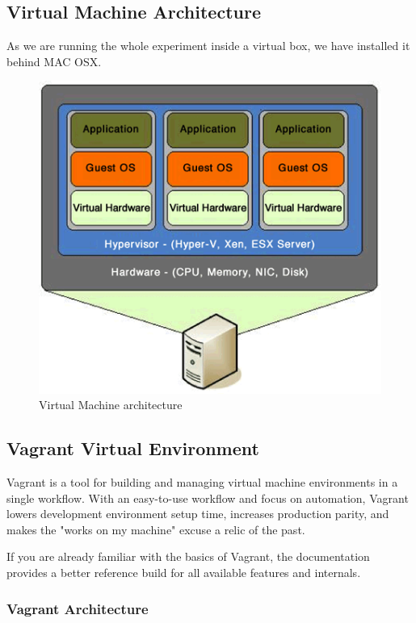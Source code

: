\documentclass[BTech]{srmuthesis}
\begin{document}
\subsection{Virtual Machine Architecture}

As we are running the whole experiment inside a virtual box, we have installed it behind MAC OSX. 

\begin{figure}[h]
    \centering
    \includegraphics[width=12cm\textwidth]{virtual_machine}
    \caption{Virtual Machine architecture}
    \label{fig:virtual_machine_architecture}
\end{figure}

\subsection{Vagrant Virtual Environment}

Vagrant is a tool for building and managing virtual machine environments in a single workflow. With an easy-to-use workflow and focus on automation, Vagrant lowers development environment setup time, increases production parity, and makes the "works on my machine" excuse a relic of the past.

If you are already familiar with the basics of Vagrant, the documentation provides a better reference build for all available features and internals.

\subsubsection{Vagrant Architecture}
\end{document}
